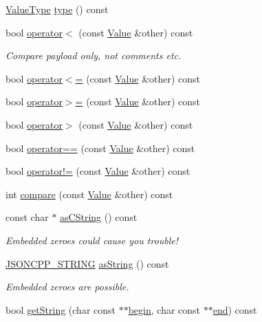 \begin{DoxyCompactItemize}
\hyperlink{namespaceJson_a7d654b75c16a57007925868e38212b4e}{Value\+Type} \hyperlink{classJson_1_1Value_a695ef31fad36b4712918b3ff80158479}{type} () const 
\item 
bool \hyperlink{classJson_1_1Value_af0ad8aa027575c3277296458f3fb7b0a}{operator$<$} (const \hyperlink{classJson_1_1Value}{Value} \&other) const 
\begin{DoxyCompactList}\small\item\em Compare payload only, not comments etc. \end{DoxyCompactList}\item 
bool \hyperlink{classJson_1_1Value_afb99dd3628fe44244b32007f9b4f369a}{operator$<$=} (const \hyperlink{classJson_1_1Value}{Value} \&other) const 
\item 
bool \hyperlink{classJson_1_1Value_acc13fc47d55abd6e2327b090b83d2911}{operator$>$=} (const \hyperlink{classJson_1_1Value}{Value} \&other) const 
\item 
bool \hyperlink{classJson_1_1Value_a3124a26067bdfde9571bc89527fc6931}{operator$>$} (const \hyperlink{classJson_1_1Value}{Value} \&other) const 
\item 
bool \hyperlink{classJson_1_1Value_a14363dda23a6ae2def9afd1590ae85d3}{operator==} (const \hyperlink{classJson_1_1Value}{Value} \&other) const 
\item 
bool \hyperlink{classJson_1_1Value_ad0f12d2a4ab74bbef08a05504b2cb81d}{operator!=} (const \hyperlink{classJson_1_1Value}{Value} \&other) const 
\item 
int \hyperlink{classJson_1_1Value_a899214ed2253d3f4f061b922b0e622b5}{compare} (const \hyperlink{classJson_1_1Value}{Value} \&other) const 
\item 
const char $\ast$ \hyperlink{classJson_1_1Value_a5b7da48b163bcec63b1424f1608b7da6}{as\+C\+String} () const 
\begin{DoxyCompactList}\small\item\em Embedded zeroes could cause you trouble! \end{DoxyCompactList}\item 
\hyperlink{json_8hpp_a1e723f95759de062585bc4a8fd3fa4be}{J\+S\+O\+N\+C\+P\+P\+\_\+\+S\+T\+R\+I\+NG} \hyperlink{classJson_1_1Value_a0f9b76085072127a228206c8e616dcbc}{as\+String} () const 
\begin{DoxyCompactList}\small\item\em Embedded zeroes are possible. \end{DoxyCompactList}\item 
bool \hyperlink{classJson_1_1Value_a1e0263113ae247a632afac43ebc4149f}{get\+String} (char const $\ast$$\ast$\hyperlink{classJson_1_1Value_ac12df0d6980600c5bac908ed0f64856e}{begin}, char const $\ast$$\ast$\hyperlink{classJson_1_1Value_a596da1926b2f2a4056bff2edb713eb0b}{end}) const 

\end{DoxyCompactItemize}
